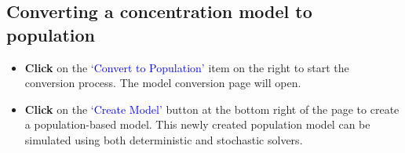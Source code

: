 \subsection{Converting a concentration model to population}
\begin{itemize}
  \item \textbf{Click} on the \textcolor{blue}{`Convert to Population'} item on the right to start the conversion process. The model conversion page will open.
  \item \textbf{Click} on the \textcolor{blue}{`Create Model'} button at the bottom right of the page to create a population-based model. This newly created population model can be simulated using both deterministic and stochastic solvers.
\end{itemize}


